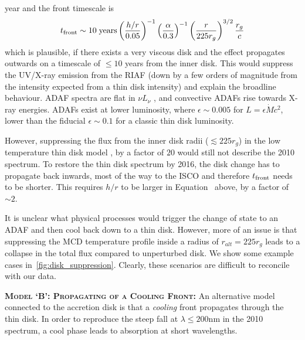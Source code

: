 \documentclass[11pt,a4paper]{article}
\begin{document}
year and the front timescale is
\begin{equation}
    t_{\rm front}  \sim  10 \; {\rm years} \left(\frac{h/r}{0.05}\right)^{-1}
                                                           \left(\frac{\alpha}{0.3}\right)^{-1}  
                                                           \left(\frac{r}{225r_{g}}\right)^{3/2}  
                                                           \frac{r_{g}}{c}
\label{eqn:t_front}
\end{equation}
which is plausible, if there exists a very viscous disk and the effect
propagates outwards on a timescale of $\leq 10$ years from the inner
disk. This would suppress the UV/X-ray emission from the RIAF (down by
a few orders of magnitude from the intensity expected from a thin disk
intensity) and explain the broadline behaviour.  ADAF spectra are flat
in $\nu L_{\nu}$ \citet{Narayan1998, Abramowicz2002, Abramowicz2013},
and convective ADAFs rise towards X-ray energies. ADAFs exist at lower
luminosity, where $\epsilon \sim 0.005$ for $L=\epsilon \dot{M}
c^{2}$, lower than the fiducial $\epsilon \sim 0.1$ for a classic thin
disk luminosity.

However, suppressing the flux from the inner disk radii ($\lesssim 225 r_{g}$)
in the low temperature thin disk model \citep{Narayan1997, Gammie1999,
Agol_Krolik2000, Afshordi_Paczynski2003, Ford2018}, by a factor of
$20$ would still not describe the 2010 spectrum. To restore the thin disk
spectrum by 2016, the disk change has to propagate back inwards, most
of the way to the ISCO and therefore $t_{\rm front}$ needs to be
shorter. This requires $h/r$ to be larger in
Equation~\label{eqn:t_front} above, by a factor of $\sim 2$.

It is unclear what physical processes would trigger the change of
state to an ADAF and then cool back down to a thin disk. However, more
of an issue is that suppressing the MCD temperature profile inside a
radius of $r_{alt} = 225 r_{g}$ leads to a collapse in the total
flux compared to unperturbed disk. We show some example cases
in~\ref{fig:disk_suppression}. Clearly, these scenarios are difficult
to reconcile with our data.

\smallskip \smallskip
\noindent
\textbf{\textsc{Model `B': Propagating of a Cooling Front: }}
An alternative model connected to the accretion disk is that a
\emph{cooling} front propagates through the thin disk.  In order to
reproduce the steep fall at $\lambda \leq 200$nm in the 2010 spectrum,
a cool phase leads to absorption at short wavelengths.
\end{document}
